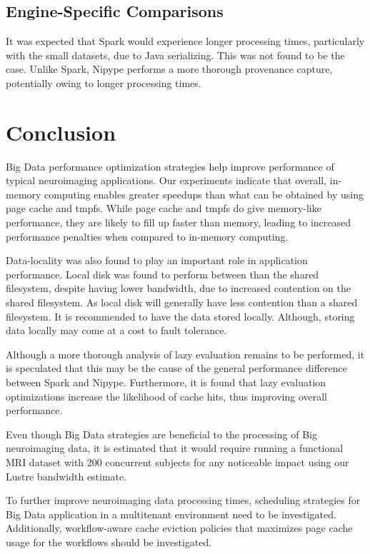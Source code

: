 \documentclass{IEEEtran}
\begin{document}
\subsection{Engine-Specific Comparisons}

It was expected that Spark would experience longer processing times, particularly
with the small datasets, due to Java serializing. This was not found to be the case. 
Unlike Spark, Nipype performs a more thorough provenance capture, potentially owing to longer
processing times.


\section{Conclusion} %
\label{sec:conclusion}

Big Data performance optimization strategies help improve performance of typical 
neuroimaging applications. Our experiments indicate that overall, in-memory computing 
enables greater speedups than what can be obtained by using page cache and tmpfs. 
While page cache and tmpfs do give memory-like performance, they are likely to fill
up faster than memory, leading to increased performance penalties when compared
to in-memory computing. 

Data-locality was also found to play an important role in 
application performance. Local disk was found to perform between than the shared
filesystem, despite having lower bandwidth, due to increased contention on the 
shared filesystem. As local disk will generally have less contention than a 
shared filesystem. It is recommended to have the data stored locally. Although, 
storing data locally may come at a cost to fault tolerance.

Although a more thorough analysis of lazy evaluation remains to be performed, it
is speculated that this may be the cause of the general performance difference 
between Spark and Nipype. Furthermore, it is found that lazy evaluation optimizations increase 
the likelihood of cache hits, thus improving overall performance.

Even though Big Data strategies are beneficial to the processing of Big 
neuroimaging data, it is estimated that it would require running a functional MRI
dataset with 200 concurrent subjects for any noticeable impact using our Lustre 
bandwidth estimate.

To further improve neuroimaging data processing times, scheduling strategies for 
Big Data application in a multitenant environment need to be investigated. 
Additionally, workflow-aware cache eviction policies that maximizes page cache 
usage for the workflows should be investigated.
\end{document}
